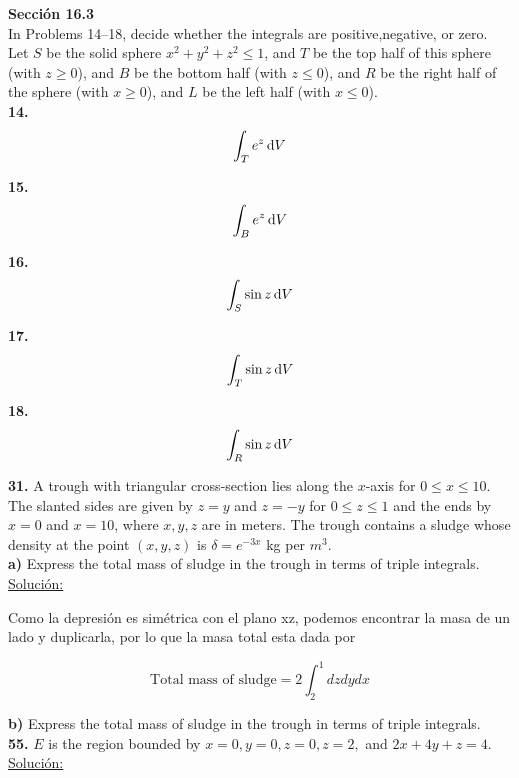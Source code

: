 \documentclass[11pt]{report}
\newcommand{\s}{\underline{Soluci\'{o}n:}}
\begin{document}
\textbf{Sección 16.3} \\

In Problems 14–18, decide whether the integrals are positive,negative, or zero.
Let $S$ be the solid sphere $x^2 + y^2 + z^2 \leq 1$, and $T$ be the top half of
this sphere (with $z \geq 0$), and $B$ be the bottom half (with $z \leq 0$), and $R$
be the right half of the sphere (with $x \geq 0$), and $L$ be the left half
(with $x \leq 0$). \\

\textbf{14.} \\

\[ \int _T e^z \, \text dV \]

\textbf{15.} \\

\[ \int _B e^z \, \text dV \]

\textbf{16.} \\

\[ \int _S \sin{z} \, \text dV \]

\textbf{17.} \\

\[ \int _T \sin{z} \, \text dV \]

\textbf{18.} \\

\[ \int _R \sin{z} \, \text dV \]

\textbf{31.} A trough with triangular cross-section lies along the $x$-axis for
$0 \leq x \leq 10$. The slanted sides are given by $z = y$ and $z = -y$ for
$0 \leq z \leq 1$ and the ends by $x = 0$ and $x = 10$, where $x, y, z$ are in meters.
The trough contains a sludge whose density at the point $(x, y, z)$ is
$\delta = e^{-3x}$ kg per $m^3$. \\

\textbf{a)} Express the total mass of sludge in the trough in terms of triple
integrals. \\

\s

Como la depresi\'{o}n es sim\'{e}trica con el plano xz, podemos encontrar la masa
de un lado y duplicarla, por lo que la masa total esta dada por

\[\text{Total mass of sludge} = 2 \int^{1}_{2} dz dy dx \]


\textbf{b)} Express the total mass of sludge in the trough in terms of triple
integrals. \\

\textbf{55.} $E$ is the region bounded by $x = 0, y = 0, z = 0, z = 2,$
and $2x + 4y + z = 4$. \\
\s
\end{document}
